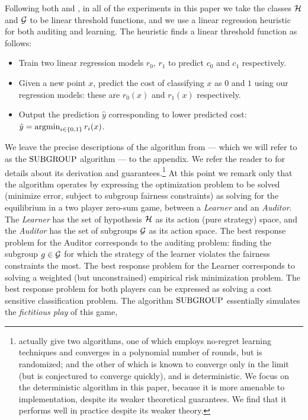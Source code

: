 Following both \cite{MSR} and \citet{KNRW18}, in all of the experiments in this paper we take the classes $\mathcal{H}$ and $\mathcal{G}$ to be linear threshold functions, and we use a linear regression heuristic for both auditing and learning. The heuristic finds a linear threshold function as follows: \\
\begin{itemize}
\item Train two linear regression models $r_0$, $r_1$ to predict $c_0$ and $c_1$ respectively.
\item Given a new point $x$, predict
the cost of classifying $x$ as $0$ and $1$ using our regression models: these are $r_0(x)$ and
$r_1(x)$ respectively.
\item Output the prediction $\hat{y}$ corresponding to lower predicted cost:
$\hat{y} = \operatorname*{\mathrm{argmin}}_{i \in \{0,1\}}r_i(x)$.
\end{itemize}
We leave the precise descriptions of the algorithm from \cite{KNRW18}
--- which we will refer to as the $\mathrm{SUBGROUP}$ algorithm --- to the
appendix. We refer the reader to \cite{KNRW18} for details about its
derivation and guarantees.\footnote{\cite{KNRW18}
  actually give two algorithms, one of which employs no-regret learning techniques and converges in a polynomial
  number of rounds, but is randomized; and the other of which
  is known to converge only in the limit (but is conjectured to converge
  quickly), and is deterministic. We focus on
  the deterministic algorithm in this paper, because it is more
  amenable to implementation, despite its weaker theoretical
  guarantees. We find that it performs well in practice despite its 
  weaker theory.}  At this point we
remark only that the algorithm operates by expressing the optimization
problem to be solved (minimize error, subject to subgroup fairness
constraints) as solving for the equilibrium in a two player zero-sum
game, between a \emph{Learner} and an \emph{Auditor}. The
\emph{Learner} has the set of hypothesis $\mathcal{H}$ as its action (pure strategy) space,
and the \emph{Auditor} has the set of subgroups $\mathcal{G}$ as its action
space. The best response problem for the Auditor corresponds to the
auditing problem: finding the subgroup $g \in \mathcal{G}$ for which the
strategy of the learner violates the fairness constraints the
most. The best response problem for the Learner corresponds to solving
a weighted (but unconstrained) empirical risk minimization
problem. The best response problem for both players can be expressed
as solving a cost sensitive classification problem. The algorithm
$\mathrm{SUBGROUP}$ essentially simulates the \emph{fictitious play} of this game,
